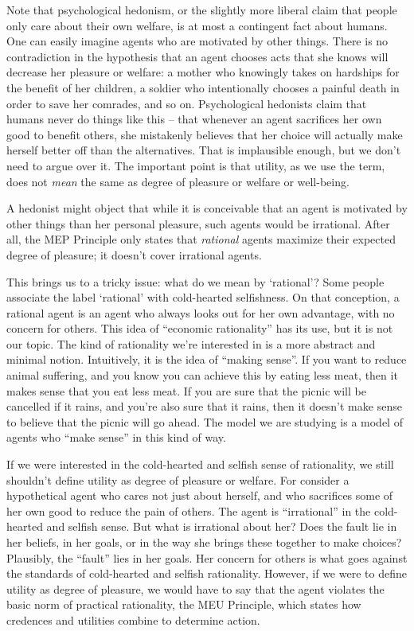 Note that psychological hedonism, or the slightly more liberal claim
that people only care about their own welfare, is at most a contingent
fact about humans. One can easily imagine agents who are motivated by
other things. There is no contradiction in the hypothesis that an
agent chooses acts that she knows will decrease her pleasure or
welfare: a mother who knowingly takes on hardships for the benefit of
her children, a soldier who intentionally chooses a painful death in
order to save her comrades, and so on. Psychological hedonists claim
that humans never do things like this -- that whenever an agent
sacrifices her own good to benefit others, she mistakenly believes
that her choice will actually make herself better off than the
alternatives. That is implausible enough, but we don't need to argue
over it. The important point is that utility, as we use the term, does
not \emph{mean} the same as degree of pleasure or welfare or
well-being.


A hedonist might object that while it is conceivable that an agent is
motivated by other things than her personal pleasure, such agents
would be irrational. After all, the MEP Principle only states that
\emph{rational} agents maximize their expected degree of pleasure; it
doesn't cover irrational agents.

This brings us to a tricky issue: what do we mean by `rational'? Some
people associate the label `rational' with cold-hearted selfishness.
On that conception, a rational agent is an agent who always looks out
for her own advantage, with no concern for others. This idea of
``economic rationality'' has its use, but it is not our topic. The
kind of rationality we're interested in is a more abstract and minimal
notion. Intuitively, it is the idea of ``making sense''.  If you want
to reduce animal suffering, and you know you can achieve this by
eating less meat, then it makes sense that you eat less meat. If you
are sure that the picnic will be cancelled if it rains, and you're
also sure that it rains, then it doesn't make sense to believe that
the picnic will go ahead. The model we are studying is a model of
agents who ``make sense'' in this kind of way.

If we were interested in the cold-hearted and selfish sense of
rationality, we still shouldn't define utility as degree of pleasure
or welfare.  For consider a hypothetical agent who cares not just
about herself, and who sacrifices some of her own good to reduce the
pain of others. The agent is ``irrational'' in the cold-hearted and
selfish sense. But what is irrational about her?  Does the fault lie
in her beliefs, in her goals, or in the way she brings these together
to make choices?  Plausibly, the ``fault'' lies in her goals. Her
concern for others is what goes against the standards of cold-hearted
and selfish rationality. However, if we were to define utility as
degree of pleasure, we would have to say that the agent violates the
basic norm of practical rationality, the MEU Principle, which states
how credences and utilities combine to determine action.

